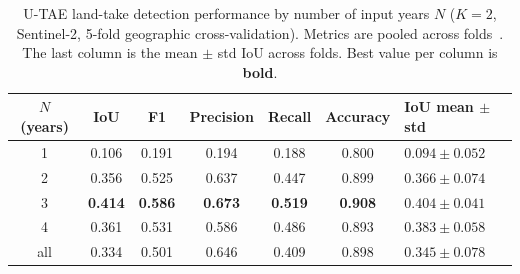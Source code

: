 

\begin{table}[ht]
  \centering
  \caption{%
    U-TAE land-take detection performance by number of input years $N$
    ($K = 2$, Sentinel-2, 5-fold geographic cross-validation).
    Metrics are pooled across folds~\citep{garnot2021pastis}.
    The last column is the mean $\pm$ std IoU across folds.
    Best value per column is \textbf{bold}.%
  }
  \label{tab:n_slicing}
  \begin{tabular}{ccccccl}
    \toprule
    $N$ (years) & IoU & F1 & Precision & Recall & Accuracy & IoU mean $\pm$ std \\
    \midrule
    1         & 0.106           & 0.191           & 0.194           & 0.188           & 0.800           & $0.094 \pm 0.052$ \\
    2         & 0.356           & 0.525           & 0.637           & 0.447           & 0.899           & $0.366 \pm 0.074$ \\
    3         & \textbf{0.414} & \textbf{0.586} & \textbf{0.673} & \textbf{0.519} & \textbf{0.908} & $0.404 \pm 0.041$ \\
    4         & 0.361           & 0.531           & 0.586           & 0.486           & 0.893           & $0.383 \pm 0.058$ \\
    \midrule
    all       & 0.334           & 0.501           & 0.646           & 0.409           & 0.898           & $0.345 \pm 0.078$ \\
    \bottomrule
  \end{tabular}
\end{table}
